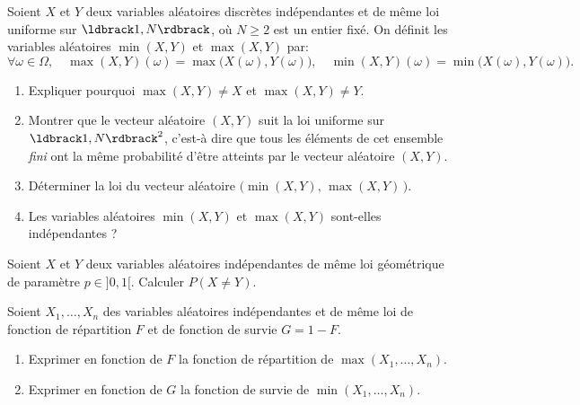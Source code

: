 \documentclass[a4paper,12pt,reqno]{amsart}
\begin{document}


\begin{exo}

  Soient $X$ et $Y$ deux variables aléatoires discrètes indépendantes et de même loi uniforme sur $\iintv{1,N}$, où $N\ge 2$ est un entier fixé. On définit les variables aléatoires $\min(X,Y)$ et $\max(X,Y)$ par:
  $
    \forall \omega\in\Omega, \quad
    \max(X,Y)(\omega)= \max\big(X(\omega),Y(\omega)\big),\quad
    \min(X,Y)(\omega)= \min\big(X(\omega),Y(\omega)\big).
  $
  \begin{enumerate}
    \item Expliquer pourquoi $\max(X,Y)\neq X$ et $\max(X,Y)\neq Y$.
    \item Montrer que le vecteur aléatoire $(X,Y)$ suit la loi uniforme sur $\iintv{1,N}^2$, c'est-à dire que tous les éléments de cet ensemble \emph{fini} ont la même probabilité d'être atteints par le vecteur aléatoire $(X,Y)$.
    \item Déterminer la loi du vecteur aléatoire $\big(\min(X,Y),\,\max(X,Y)\,\big)$.
    \item Les variables aléatoires $\min(X,Y)$ et $\max(X,Y)$ sont-elles indépendantes ?
  \end{enumerate}

\end{exo}


\begin{exo}

  Soient $X$ et $Y$ deux variables aléatoires indépendantes de même loi géométrique de paramètre $p\in]0,1[$. Calculer $P(X\neq Y)$.

\end{exo}


\begin{exo}

  Soient $X_1,\dots, X_n$ des variables aléatoires indépendantes et de même loi de fonction de répartition $F$ et de fonction de survie $G=1-F$.

  \begin{enumerate}
    \item Exprimer en fonction de $F$ la fonction de répartition de $\max(X_1,\dots,X_n)$.
    \item Exprimer en fonction de $G$ la fonction de survie de $\min(X_1,\dots,X_n)$.
  \end{enumerate}

\end{exo}
\end{document}
